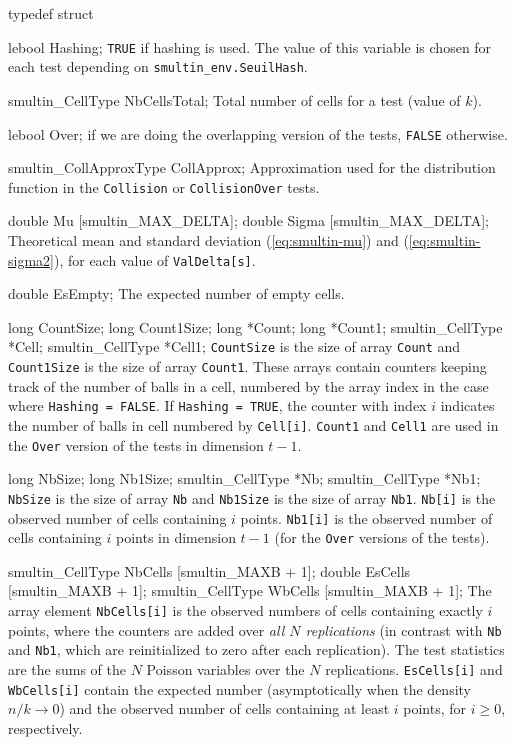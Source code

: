 typedef struct {

   lebool Hashing;
\endcode
\tabb
  {\tt TRUE} if hashing is used.
  The value of this variable is chosen for each  test depending on
   {\tt smultin\_env.SeuilHash}.
\endtabb
\code

   smultin_CellType NbCellsTotal;
\endcode
\tabb
   Total number of cells for a test (value of $k$).
 \endtabb
\code

   lebool Over;
\endcode
{} if we are doing the overlapping version of the tests,
      {\tt FALSE} otherwise.
\endtabb
\code

   smultin_CollApproxType CollApprox;
\endcode
\tabb Approximation used for the  distribution function in the 
    {\tt Collision} or {\tt CollisionOver} tests.
 \endtabb
\code

   double Mu [smultin_MAX_DELTA];
   double Sigma [smultin_MAX_DELTA];
\endcode
\tabb
   Theoretical mean and standard deviation (\ref{eq:smultin-mu}) and
   (\ref{eq:smultin-sigma2}), for each value of {\tt ValDelta[s]}.
\endtabb
\code

   double EsEmpty;
\endcode
\tabb
  The expected number of empty cells.
\endtabb
\code

   long CountSize;
   long Count1Size;
   long *Count;
   long *Count1;
   smultin_CellType *Cell;
   smultin_CellType *Cell1;
\endcode
\tabb
  {\tt CountSize} is the size of array {\tt Count} and
  {\tt Count1Size} is the size of array {\tt Count1}.  These arrays contain
  counters keeping track of the number of balls in a cell, numbered
  by the array index in the case where {\tt Hashing = FALSE}. 
  If {\tt Hashing = TRUE}, the counter with index $i$ 
  indicates the number of balls in cell numbered by  {\tt Cell[i]}.
  {\tt Count1} and  {\tt Cell1} are used in 
  the {\tt Over} version of the  tests in dimension $t-1$.
\endtabb
\code

   long NbSize;
   long Nb1Size;
   smultin_CellType *Nb;
   smultin_CellType *Nb1;
\endcode
\tabb
  {\tt NbSize} is the size of array {\tt Nb} and
  {\tt Nb1Size} is the size of array {\tt Nb1}.
  {\tt Nb[i]} is the observed number of cells containing $i$ points.
  {\tt Nb1[i]} is the observed number of cells  containing $i$ points
  in dimension $t-1$ (for the {\tt Over} versions of the tests).
\endtabb
\code

   smultin_CellType NbCells [smultin_MAXB + 1];
   double EsCells [smultin_MAXB + 1];
   smultin_CellType WbCells [smultin_MAXB + 1];
\endcode
\tabb
  The array element {\tt NbCells[i]} is the observed  numbers of 
  cells containing exactly $i$ points, where the counters are added over
  {\em all $N$ replications\/} (in contrast with {\tt Nb} and {\tt Nb1}, 
  which are reinitialized to zero after each replication).
  The test statistics are the sums of the $N$  Poisson variables
  over the $N$ replications.
  {\tt EsCells[i]} and {\tt WbCells[i]} contain the expected number
  (asymptotically when the density $n/k \rightarrow 0$) and the
  observed number of cells containing at least $i$ points, for $i\ge 0$,
  respectively. 
\endtabb
\code

}
